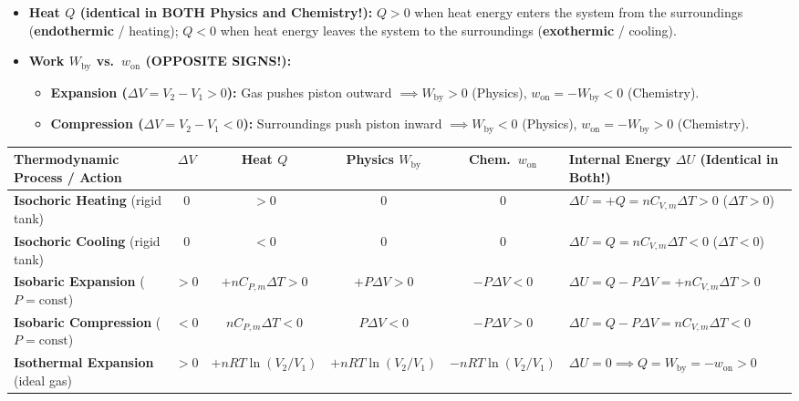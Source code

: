 \begin{formulacard}
\begin{itemize}
  \item \textbf{Heat $Q$ (identical in BOTH Physics and Chemistry!):} $Q > 0$ when heat energy enters the system from the surroundings (\textbf{endothermic} / heating); $Q < 0$ when heat energy leaves the system to the surroundings (\textbf{exothermic} / cooling).
  \item \textbf{Work $W_{\mathrm{by}}$ vs.\ $w_{\mathrm{on}}$ (OPPOSITE SIGNS!):}
  \begin{itemize}
    \item \textbf{Expansion ($\Delta V = V_2 - V_1 > 0$):} Gas pushes piston outward $\implies W_{\mathrm{by}} > 0$ (Physics), $w_{\mathrm{on}} = -W_{\mathrm{by}} < 0$ (Chemistry).
    \item \textbf{Compression ($\Delta V = V_2 - V_1 < 0$):} Surroundings push piston inward $\implies W_{\mathrm{by}} < 0$ (Physics), $w_{\mathrm{on}} = -W_{\mathrm{by}} > 0$ (Chemistry).
  \end{itemize}
\end{itemize}
\par\smallskip\noindent
\footnotesize\setlength{\tabcolsep}{3.5pt}\renewcommand{\arraystretch}{1.12}
\begin{tabularx}{\linewidth}{@{}l c c c c X@{}}
\toprule
\textbf{Thermodynamic Process / Action} & $\Delta V$ & \textbf{Heat $Q$} & \textbf{Physics $W_{\mathrm{by}}$} & \textbf{Chem.\ $w_{\mathrm{on}}$} & \textbf{Internal Energy $\Delta U$ (Identical in Both!)} \\
\midrule
\textbf{Isochoric Heating} (rigid tank) & $0$ & $>0$ & $0$ & $0$ & $\Delta U = +Q = nC_{V,m}\Delta T > 0$ ($\Delta T > 0$) \\
\textbf{Isochoric Cooling} (rigid tank) & $0$ & $<0$ & $0$ & $0$ & $\Delta U = Q = nC_{V,m}\Delta T < 0$ ($\Delta T < 0$) \\
\textbf{Isobaric Expansion} ($P=\mathrm{const}$) & $>0$ & $+nC_{P,m}\Delta T > 0$ & $+P\Delta V > 0$ & $-P\Delta V < 0$ & $\Delta U = Q - P\Delta V = +nC_{V,m}\Delta T > 0$ \\
\textbf{Isobaric Compression} ($P=\mathrm{const}$) & $<0$ & $nC_{P,m}\Delta T < 0$ & $P\Delta V < 0$ & $-P\Delta V > 0$ & $\Delta U = Q - P\Delta V = nC_{V,m}\Delta T < 0$ \\
\textbf{Isothermal Expansion} (ideal gas) & $>0$ & $+nRT\ln(V_2/V_1)$ & $+nRT\ln(V_2/V_1)$ & $-nRT\ln(V_2/V_1)$ & $\Delta U = 0 \implies Q = W_{\mathrm{by}} = -w_{\mathrm{on}} > 0$ \\

\end{tabularx}
\end{formulacard}
